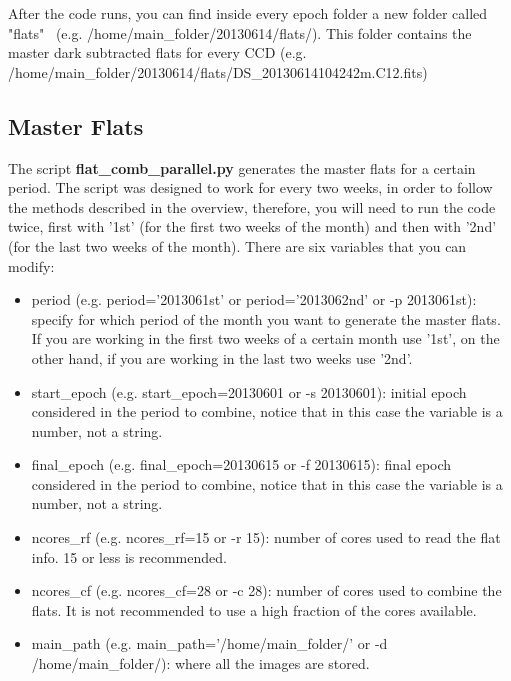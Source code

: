 \documentclass[letter, 12pt]{article}
\begin{document}
After the code runs, you can find inside every epoch folder a new folder called "flats"  
\ (e.g.  /home/main\_folder/20130614/flats/).
 This folder contains the master dark subtracted flats for every CCD (e.g. /home/main\_folder/20130614/flats/DS\_20130614104242m.C12.fits)


\subsection{Master Flats}

The script \textbf{flat\_comb\_parallel.py} generates the master flats for a certain period. The script was designed to work for every two weeks, in order to follow the methods described in the overview, therefore, you will need to run the code twice, first with '1st' (for the first two weeks of the month) and then with '2nd' (for the last two weeks of the month). There are six variables that you can modify:

\begin{itemize}

\item period (e.g. period='2013061st' or period='2013062nd'  or -p 2013061st): specify for which period of the month you want to generate the master flats. If you are working in the first two weeks of a certain month use '1st', on the other hand, if you are working in the last two weeks use '2nd'.

\item start\_epoch (e.g. start\_epoch=20130601 or -s 20130601): initial epoch considered in the period to combine, notice that in this case the variable is a number, not a string.

\item final\_epoch (e.g. final\_epoch=20130615 or -f 20130615): final epoch considered in the period to combine, notice that in this case the variable is a number, not a string.

\item ncores\_rf (e.g. ncores\_rf=15 or -r 15): number of cores used to read the flat info. 15 or less is recommended. 

\item ncores\_cf (e.g. ncores\_cf=28 or -c 28): number of cores used to combine the flats. It is not recommended to use a high fraction of the cores available. 

\item main\_path (e.g. main\_path='/home/main\_folder/' or -d /home/main\_folder/): where all the images are stored.


\end{itemize}
\end{document}
